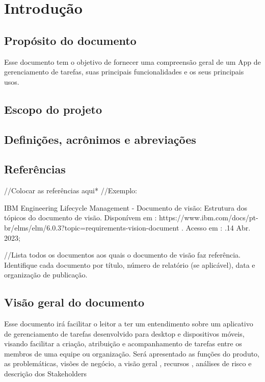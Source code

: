\chapter{Introdução}
\section{Propósito do documento}
Esse documento tem o objetivo de fornecer uma compreensão geral de um App de gerenciamento de tarefas, suas principais funcionalidades e os seus principais usos.
\section{Escopo do projeto}
\section{Definições, acrônimos e abreviações}
\section{Referências}
//Colocar as referências aqui*
//Exemplo:

IBM Engineering Lifecycle Management - Documento de visão: Estrutura dos tópicos do documento de visão.
Disponívem em : https://www.ibm.com/docs/pt-br/elms/elm/6.0.3?topic=requirements-vision-document . Acesso em : .14 Abr. 2023;

//Lista todos os documentos aos quais o documento de visão faz referência. Identifique cada documento por título, número de relatório (se aplicável), data e organização de publicação.
\section{Visão geral do documento}
Esse documento irá facilitar o leitor a ter um entendimento sobre um aplicativo de gerenciamento de tarefas desenvolvido para desktop e dispositivos móveis, visando facilitar a criação, atribuição e acompanhamento de tarefas entre os membros de uma equipe ou organização. Será apresentado as funções do produto, as problemáticas, visões de negócio, a visão geral , recursos , análises de risco e descrição dos Stakeholders


